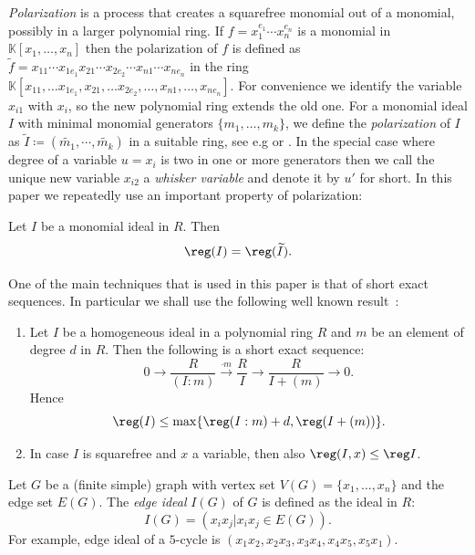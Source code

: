    \emph{Polarization} is a process that creates a squarefree monomial out of a monomial, possibly in a larger polynomial ring. If $f=x_1^{e_1}\cdots x_n^{e_n}$ is a monomial in $\mathbb{K}[x_1, \ldots , x_n]$ then the polarization of $f$ is defined as $\tilde{f}=x_{11}\cdots x_{1e_1} x_{21} \cdots x_{2e_2}\cdots x_{n1} \cdots x_{n e_n}$ in the ring $\mathbb{K}[x_{11},\ldots x_{1e_1}, x_{21},\ldots x_{2e_2}, \ldots,  x_{n1}, \ldots, x_{ne_n}]$.
    For convenience
    we identify the variable $x_{i1}$ with $x_i$, so the new polynomial ring extends the old one.
    For a monomial ideal $I$ with minimal monomial generators $\{m_1,\ldots, m_k\}$, we define the \emph{polarization} of $I$ as $\widetilde{I}\coloneqq(\widetilde{m_1}, \cdots, \widetilde{m_k})$ in a suitable ring, see e.g
   \cite{Herzog'sBook} or \cite[Sec. 1.6]{kummini_thesis}. In the special case where degree of a variable $u=x_i$ is two in one or more generators then we call the unique new variable $x_{i2}$ a \emph{whisker variable} and denote it by $u'$ for short.
  In this paper we repeatedly use an important property of 
polarization:
\begin{theorem} Let $I$ be a monomial
ideal in $R$.
Then
$$\reg(I)=\reg(\widetilde{I}).$$
\label{thm:2.1}
\end{theorem}

One of the main techniques that is used in this paper is that of short exact sequences. 
In particular we shall use the following well known result~\cite[Lemma. 2.11]{banerjee}:

\begin{theorem}
\begin{enumerate}[label=(\roman*)]
\item Let $I$ be a homogeneous ideal in a polynomial ring $R$ and $m$ be an element of degree $d$ in $R$. Then the following is a short exact sequence: $$0 \longrightarrow \frac{R}{(I:m)} \overset{\cdot m} \longrightarrow \frac{R}{I} \longrightarrow \frac{R}{I+(m)} \longrightarrow 0.$$
Hence $$\reg(I) \leq \max \{\reg (I:m) +d, \reg (I+(m))\}.$$
\item In case $I$ is squarefree and $x$ a variable, then also $\reg(I,x) \leq \reg I$.
\end{enumerate}
\label{thm:2.2}
\end{theorem}


 Let $G$ be a (finite simple) graph with vertex set $V(G)=\{x_1, \ldots ,x_n\}$ and the edge set $E(G)$. The  \textit{edge ideal} $I(G)$ of $G$ is defined as the ideal in $R$: $$I(G)=(x_i x_j|x_ix_j \in E(G)).$$
 For example, edge ideal of a $5$-cycle is $(x_1x_2,x_2x_3,x_3x_4,x_4x_5,x_5x_1)$.
 
